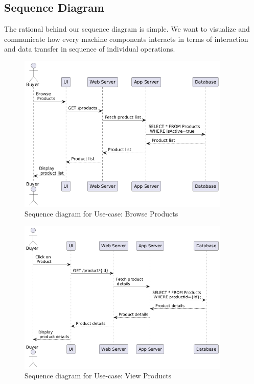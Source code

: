 \subsection{Sequence Diagram}

The rational behind our sequence diagram is simple. We want to visualize and communicate how every machine components interacts in terms of interaction and data transfer in sequence of individual operations.


\begin{figure}[!h]
	\centering
	\includegraphics[width=0.9\textwidth]{chapters/ch-04/300_usecase_browse.png} %
	\caption{Sequence diagram for Use-case: Browse Products}
	\label{fig:seq_01} %
\end{figure}

\begin{figure}[!h]
	\centering
	\includegraphics[width=0.9\textwidth]{chapters/ch-04/301_usecase_view.png} %
	\caption{Sequence diagram for Use-case: View Products}
	\label{fig:seq_02} %
\end{figure}

